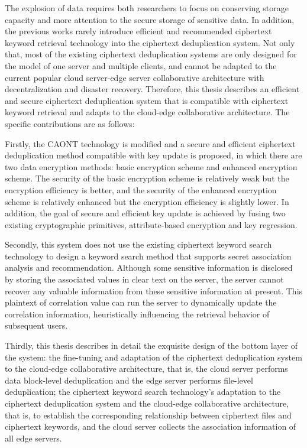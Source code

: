 \documentclass[promaster]{thesis-uestc}
\begin{document}
\begin{englishabstract}

    The explosion of data requires both researchers to focus on conserving storage capacity and more attention to the secure storage of sensitive data. In addition, the previous works rarely introduce efficient and recommended ciphertext keyword retrieval technology into the ciphertext deduplication system. Not only that, most of the existing ciphertext deduplication systems are only designed for the model of one server and multiple clients, and cannot be adapted to the current popular cloud server-edge server collaborative architecture with decentralization and disaster recovery. Therefore, this thesis describes an efficient and secure ciphertext deduplication system that is compatible with ciphertext keyword retrieval and adapts to the cloud-edge collaborative architecture. The specific contributions are as follows:

    Firstly, the CAONT technology is modified and a secure and efficient ciphertext deduplication method compatible with key update is proposed, in which there are two data encryption methods: basic encryption scheme and enhanced encryption scheme. The security of the basic encryption scheme is relatively weak but the encryption efficiency is better, and the security of the enhanced encryption scheme is relatively enhanced but the encryption efficiency is slightly lower. In addition, the goal of secure and efficient key update is achieved by fusing two existing cryptographic primitives, attribute-based encryption and key regression.

    Secondly, this system does not use the existing ciphertext keyword search technology to design a keyword search method that supports secret association analysis and recommendation. Although some sensitive information is disclosed by storing the associated values in clear text on the server, the server cannot recover any valuable information from these sensitive information at present. This plaintext of correlation value can run the server to dynamically update the correlation information, heuristically influencing the retrieval behavior of subsequent users.

    Thirdly, this thesis describes in detail the exquisite design of the bottom layer of the system: the fine-tuning and adaptation of the ciphertext deduplication system to the cloud-edge collaborative architecture, that is, the cloud server performs data block-level deduplication and the edge server performs file-level deduplication; the ciphertext keyword search technology's adaptation to the ciphertext deduplication system and the cloud-edge collaborative architecture, that is, to establish the corresponding relationship between ciphertext files and ciphertext keywords, and the cloud server collects the association information of all edge servers.


\end{englishabstract}
\end{document}
